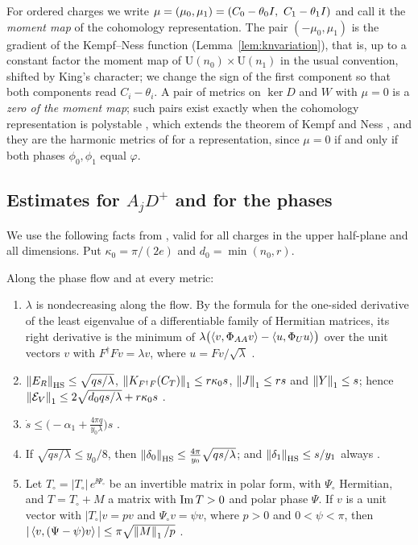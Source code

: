 For ordered charges we write
$\mu=(\mu_0,\mu_1)=(C_0-\theta_0\id,\ C_1-\theta_1\id)$ and call it the
\emph{moment map} of the cohomology representation. The pair
$(-\mu_0,\mu_1)$ is the gradient of the Kempf--Ness function
(Lemma~\ref{lem:knvariation}), that is, up to a constant factor the moment
map of $\mathrm U(n_0)\times\mathrm U(n_1)$ in the usual convention, shifted
by King's character; we change the sign of the first component so that both
components read $C_i-\theta_i$. A pair of metrics on
$\ker D$ and $W$ with $\mu=0$ is a \emph{zero of the moment map}; such pairs
exist exactly when the cohomology representation is polystable
\cite[Proposition~6.5]{kin94}, which extends the theorem of Kempf and Ness
\cite{kn79}, and they are the harmonic metrics of \cite{hkkp26} for a
representation, since $\mu=0$ if and only if both phases $\phi_0,\phi_1$ equal
$\varphi$.

\subsection{Estimates for \texorpdfstring{$A_jD^+$}{A\_jD+} and for the phases}
We use the following facts from \cite{wue26}, valid for all charges in the
upper half-plane and all dimensions. Put $\kappa_0=\pi/(2e)$ and
$d_0=\min(n_0,r)$.

\begin{proposition}\label{prop:imported}
Along the phase flow and at every metric:
\begin{enumerate}
\item[(i)] $\lambda$ is nondecreasing along the flow. By the formula for the
 one-sided derivative of the least eigenvalue of a differentiable family of
 Hermitian matrices, its right derivative is the minimum of
 $\lambda\bigl(\left\langle v,\Phi_{AA}v\right\rangle-\left\langle u,\Phi_Uu\right\rangle\bigr)$ over the unit
 vectors $v$ with $F^\dagger Fv=\lambda v$, where $u=Fv/\sqrt\lambda$
 \cite[Lemma~4.3 and \S6.1]{wue26}.
\item[(ii)] $\left\lVert E_R\right\rVert_{\mathrm{HS}}\leq\sqrt{qs/\lambda}$,
 $\left\lVert K_{F^\dagger F}(C_T)\right\rVert_1\leq r\kappa_0s$, $\left\lVert J\right\rVert_1\leq rs$ and
 $\left\lVert Y\right\rVert_1\leq s$; hence
 $\left\lVert\mathcal E_V\right\rVert_1\leq2\sqrt{d_0qs/\lambda}+r\kappa_0s$
 \cite[Lemma~4.2, \S6.1 and \S6.3]{wue26}.
\item[(iii)] $\dot s\leq\bigl(-\alpha_1+\frac{4\pi q}{y_0\lambda}\bigr)s$
 \cite[\S6.2]{wue26}.
\item[(iv)] If $\sqrt{qs/\lambda}\leq y_0/8$, then
 $\left\lVert\delta_0\right\rVert_{\mathrm{HS}}\leq\frac{4\pi}{y_0}\sqrt{qs/\lambda}$; and
 $\left\lVert\delta_1\right\rVert_{\mathrm{HS}}\leq s/y_1$ always
 \cite[Lemma~3.1 and \S6.2]{wue26}.
\item[(v)] Let $T_\circ=|T_\circ|\,e^{\ii\Psi_\circ}$ be an invertible
 matrix in polar form, with $\Psi_\circ$ Hermitian, and $T=T_\circ+M$ a
 matrix with $\operatorname{Im} T>0$ and polar phase $\Psi$. If $v$ is a unit vector with
 $|T_\circ|v=pv$ and $\Psi_\circ v=\psi v$, where $p>0$ and $0<\psi<\pi$,
 then $|\left\langle v,(\Psi-\psi)v\right\rangle|\leq\pi\sqrt{\left\lVert M\right\rVert_1/p}$
 \cite[Lemma~3.2]{wue26}.
\end{enumerate}
\end{proposition}

